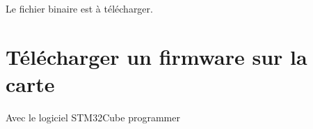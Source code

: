 \documentclass{article}
\begin{document}
Le fichier binaire est à télécharger.

\section{Télécharger un firmware sur la carte}

Avec le logiciel STM32Cube programmer

\end{document}
